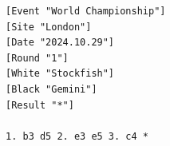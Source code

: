 \begin{lstlisting}
[Event "World Championship"]
[Site "London"]
[Date "2024.10.29"]
[Round "1"]
[White "Stockfish"]
[Black "Gemini"]
[Result "*"]

1. b3 d5 2. e3 e5 3. c4 *
\end{lstlisting}